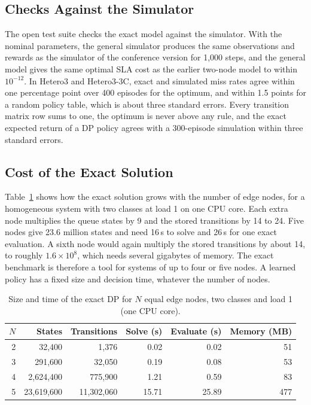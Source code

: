 \documentclass[journal]{IEEEtran}
\begin{document}
\subsection{Checks Against the Simulator}
The open test suite checks the exact model against the simulator. With the nominal parameters, the general simulator produces the same observations and rewards as the simulator of the conference version for 1,000 steps, and the general model gives the same optimal SLA cost as the earlier two-node model to within $10^{-12}$. In Hetero3 and Hetero3-3C, exact and simulated miss rates agree within one percentage point over 400 episodes for the optimum, and within 1.5 points for a random policy table, which is about three standard errors. Every transition matrix row sums to one, the optimum is never above any rule, and the exact expected return of a DP policy agrees with a 300-episode simulation within three standard errors.

\subsection{Cost of the Exact Solution}
Table~\ref{tab:scaling} shows how the exact solution grows with the number of edge nodes, for a homogeneous system with two classes at load 1 on one CPU core. Each extra node multiplies the queue states by 9 and the stored transitions by 14 to 24. Five nodes give 23.6 million states and need 16\,s to solve and 26\,s for one exact evaluation. A sixth node would again multiply the stored transitions by about 14, to roughly $1.6\times10^8$, which needs several gigabytes of memory. The exact benchmark is therefore a tool for systems of up to four or five nodes. A learned policy has a fixed size and decision time, whatever the number of nodes.

\begin{table}[t]
\caption{Size and time of the exact DP for $N$ equal edge nodes, two classes and load 1 (one CPU core).}
\label{tab:scaling}
\centering
\footnotesize
\setlength{\tabcolsep}{3pt}
\begin{tabular}{@{}rrrrrr@{}}
\toprule
$N$ & States & Transitions & Solve (s) & Evaluate (s) & Memory (MB) \\
\midrule
2 & 32,400 & 1,376 & 0.02 & 0.02 & 51 \\
3 & 291,600 & 32,050 & 0.19 & 0.08 & 53 \\
4 & 2,624,400 & 775,900 & 1.21 & 0.59 & 83 \\
5 & 23,619,600 & 11,302,060 & 15.71 & 25.89 & 477 \\
\bottomrule
\end{tabular}
\end{table}
\end{document}
